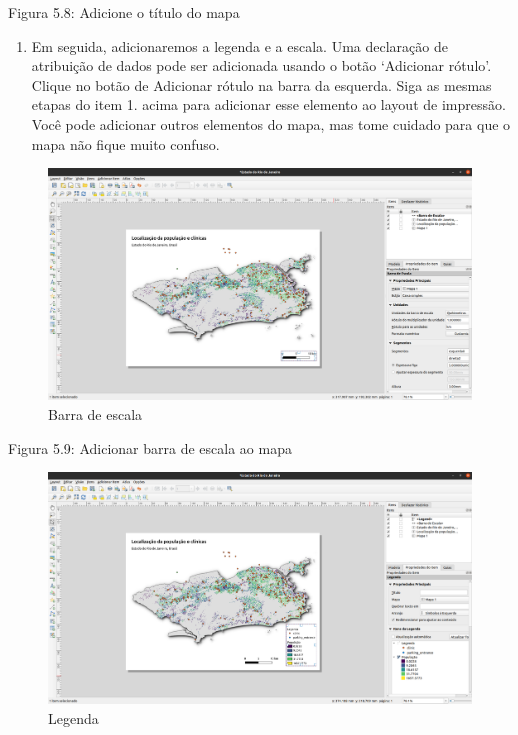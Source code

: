 \documentclass[
]{book}
\providecommand{\tightlist}{%
  \setlength{\itemsep}{0pt}\setlength{\parskip}{0pt}}
\begin{document}
Figura 5.8: Adicione o título do mapa

\begin{enumerate}
\def\labelenumi{\arabic{enumi}.}
\setcounter{enumi}{1}
\tightlist
\item
  Em seguida, adicionaremos a legenda e a escala. Uma declaração de atribuição de dados pode ser adicionada usando o botão `Adicionar rótulo'. Clique no botão de Adicionar rótulo na barra da esquerda. Siga as mesmas etapas do item 1. acima para adicionar esse elemento ao layout de impressão. Você pode adicionar outros elementos do mapa, mas tome cuidado para que o mapa não fique muito confuso.
\end{enumerate}

\begin{figure}
\centering
\includegraphics{media/modulo5/scale-bar.png}
\caption{Barra de escala}
\end{figure}

Figura 5.9: Adicionar barra de escala ao mapa

\begin{figure}
\centering
\includegraphics{media/modulo5/legend.png}
\caption{Legenda}
\end{figure}
\end{document}
